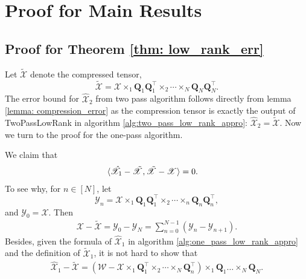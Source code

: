 \section{Proof for Main Results}
\subsection{Proof for Theorem \ref{thm: low_rank_err}}
Let $\tilde{\mathscr{X}}$ denote the compressed tensor, 
\begin{equation}
\label{eq:definition_of_compression_tensor}
\tilde{\mathscr{X}} = \mathscr{X}\times_1  \mathbf{Q}_1\mathbf{Q}_1^\top \times_2 \cdots \times_N \mathbf{Q}_N\mathbf{Q}_N^\top.
\end{equation}
The error bound for $\hat{\mathscr{X}}_2$ from two pass algorithm follows directly from lemma \ref{lemma: compression_error} as the compression tensor is exactly the output of TwoPassLowRank in algorithm \ref{alg:two_pass_low_rank_appro}: $ \hat{\mathscr{X}}_2 = \tilde{\mathscr{X}}$. Now we turn to the proof for the one-pass algorithm. \par 
We claim that 
\begin{equation}
\label{eq:inner_zero}
\begin{aligned}
&\langle \hat{\mathscr{X}}_1 - \Tilde{\mathscr{X}}, \Tilde{\mathscr{X}} - \mathscr{X} \rangle = 0. 
\end{aligned}
\end{equation}
To see why, for $n \in [N]$, let 
\begin{equation} 
\label{eq:definition_Y_n}
\mathscr{Y}_n = \mathscr{X} \times_1 \mathbf{Q}_1\mathbf{Q}_1^\top \times_2 \cdots \times_n \mathbf{Q}_n\mathbf{Q}_n^\top,
\end{equation}
and $\mathscr{Y}_0 = \mathscr{X}$. 
Then 
\begin{equation}\label{eq: y_diff}
\begin{aligned}
\mathscr{X}-\tilde{\mathscr{X}} = \mathscr{Y}_0 - \mathscr{Y}_N= \sum_{n=0}^{N-1} (\mathscr{Y}_n - \mathscr{Y}_{n+1}).
\end{aligned}
\end{equation}
Besides, given the formula of $\hat{\mathscr{X}}_1$ in algorithm \ref{alg:one_pass_low_rank_appro} and the definition of $\tilde{\mathscr{X}}_1$, it is not hard to show that 
\begin{equation}
\begin{aligned}
\mathscr{\hat{X}}_1-\tilde{\mathscr{X}}= (\mathscr{W}-\mathscr{X}\times_1 \mathbf{Q}_1^\top \times_2 \cdots \times_N \mathbf{Q}_n^\top)  \times_1 \mathbf{Q}_1 \dots \times_N \mathbf{Q}_N. 
\end{aligned}
\end{equation}
